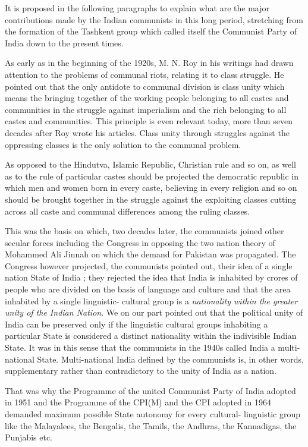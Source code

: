 It is proposed in the following paragraphs to explain what are the major contributions made by the Indian communists in this long period, stretching from the formation of the Tashkent group which called itself the Communist Party of India down to the present times. 

As early as in the beginning of the 1920s, M. N. Roy in his writings had drawn attention to the problems of communal riots, relating it to class struggle. He pointed out that the only antidote to communal division is class unity which means the bringing together of the working people belonging to all castes and communities in the struggle against imperialism and the rich belonging to all castes and communities. This principle is even relevant today, more than seven decades after Roy wrote his articles. Class unity through struggles against the oppressing classes is the only solution to the communal problem. 

As opposed to the Hindutva, Islamic Republic, Christian rule and so on, as well as to the rule of particular castes should be projected the democratic republic in which men and women born in every caste, believing in every religion and so on should be brought together in the struggle against the exploiting classes cutting across all caste and communal differences among the ruling classes. 

This was the basis on which, two decades later, the communists joined other secular forces including the Congress in opposing the two nation theory of Mohammed Ali Jinnah on 
which the demand for Pakistan was propagated. The Congress however projected, the communists pointed out, their idea of a single nation State of India ; they rejected the idea that India is inhabited by crores of people who are divided on the basis of language and culture and that the area inhabited by a single linguistic- cultural group is a \textit{nationality within the greater unity of the Indian Nation}. We on our part pointed out that the political unity of India can be preserved only if the linguistic cultural groups inhabiting a particular State is considered a distinct nationality within the indivisible Indian State. It was in this sense that the communists in the 1940s called India a multi-national State. Multi-national India defined by the communists is, in other words, supplementary rather than contradictory to the unity of India as a nation. 

That was why the Programme of the united Communist Party of India adopted in 1951 and the Programme of the CPI(M) and the CPI adopted in 1964 demanded maximum possible State autonomy for every cultural- linguistic group like the Malayalees, the Bengalis, the Tamils, the Andhras, the Kannadigas, the Punjabis etc. 

